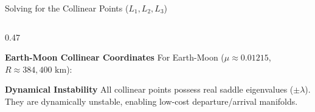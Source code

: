 \documentclass[aspectratio=169, 10pt]{beamer}
\begin{document}
\begin{frame}{Solving for the Collinear Points ($L_1, L_2, L_3$)}
\begin{columns}[t]
        \begin{column}{0.47\textwidth}
            \begin{exampleblock}{\textbf{Earth-Moon Collinear Coordinates}}
                \scriptsize
                For Earth-Moon ($\mu \approx 0.01215$, $R \approx 384,400\text{ km}$):
                \par\vspace{2pt}
                \centering
            \end{exampleblock}
            \vspace{-0.1cm}
            \begin{alertblock}{\textbf{Dynamical Instability}}
                \scriptsize
                All collinear points possess real saddle eigenvalues ($\pm \lambda$). They are dynamically unstable, enabling low-cost departure/arrival manifolds.
            \end{alertblock}
        \end{column}
    \end{columns}
\end{frame}
\end{document}
